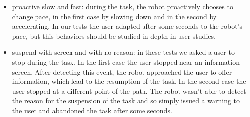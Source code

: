 \begin{itemize}
\item proactive slow and fast: during the task, the robot proactively chooses to change pace, in the first case by slowing down and in the second by accelerating. In our tests the user adapted after some seconds to the robot's pace, but this behaviors should be studied in-depth in user studies.
\item suspend with screen and with no reason: in these tests we asked a user to stop during the task. In the first case the user stopped near an information screen. After detecting this event, the robot approached the user to offer information, which lead to the resumption of the task. In the second case the user stopped at a different point of the path. The robot wasn't able to detect the reason for the suspension of the task and so simply   issued a warning to the user and abandoned the task after some seconds.
\end{itemize}






